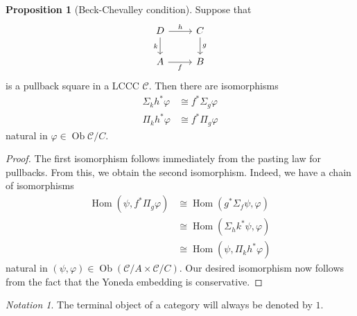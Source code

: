 \documentclass[10pt,letterpaper,cm]{nupset}
\theoremstyle{definition}
\theoremstyle{theorem}
\newtheorem{prop}[definition]{Proposition}
\theoremstyle{remark}
\newtheorem*{notation}{Notation}
\DeclareMathOperator{\ob}{Ob}
\newcommand{\0}{\mathbf{0}}
\newcommand{\1}{\mathbf{1}}
\newcommand{\2}{\mathbf{2}}
\renewcommand{\c}{\mathscr{C}}
\DeclareMathOperator{\Hom}{Hom}
\begin{document}
\smallskip

\begin{prop}[Beck-Chevalley condition]\label{C-B} Suppose that
\[
\begin{tikzcd}
D \arrow[d, "k"'] \arrow[r, "h"] & C \arrow[d, "g"] \\
A \arrow[r, "f"']                & B               
\end{tikzcd}
\] is a pullback square in a LCCC $\c$. Then there are isomorphisms 
\begin{align*}
\Sigma_k{h^{\ast}{\varphi}} &  \cong f^{\ast}{\Sigma_g{\varphi}}
\\  \Pi_k{{h^{\ast}{\varphi}}} & \cong f^{\ast}{\Pi_g{\varphi}}     
\end{align*}
 natural in $\varphi \in \ob{\c/C}$.
\end{prop}
\begin{proof} 
The first isomorphism follows immediately from the pasting law for pullbacks. From this, we obtain the second isomorphism. Indeed, we have a chain of isomorphisms
\begin{align*}
\Hom\left(\psi, f^{\ast}{\Pi_g{\varphi}}\right) & \cong \Hom\left(g^{\ast}{\Sigma_f{\psi}}, \varphi\right) 
\\ & \cong \Hom\left(\Sigma_h{k^{\ast}{\psi}}, \varphi\right) 
\\ & \cong \Hom\left(\psi , \Pi_k{h^{\ast}{\varphi}}  \right) 
\end{align*}
natural  in $\left(\psi, \varphi\right) \in \ob\left(\c/A \times \c/C\right)$. Our desired isomorphism now follows from the fact that  the Yoneda embedding is conservative.
\end{proof}

\medskip

\begin{notation}
The terminal object of a category will always be denoted by $1$.
\end{notation}
\end{document}
